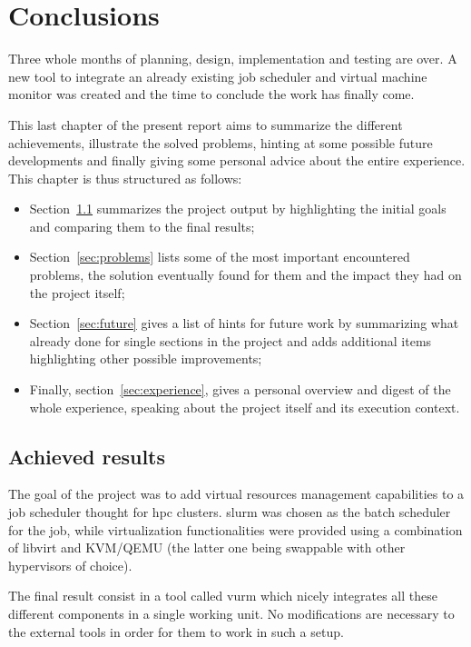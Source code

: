 \chapter{Conclusions}
\label{sec:conclusions}

Three whole months of planning, design, implementation and testing are over. A new tool to integrate an already existing job scheduler and virtual machine monitor was created and the time to conclude the work has finally come.

This last chapter of the present report aims to summarize the different achievements, illustrate the solved problems, hinting at some possible future developments and finally giving some personal advice about the entire experience. This chapter is thus structured as follows:

\begin{itemize}
	\item Section~\ref{sec:results} summarizes the project output by highlighting the initial goals and comparing them to the final results;
	\item Section~\ref{sec:problems} lists some of the most important encountered problems, the solution eventually found for them and the impact they had on the project itself;
	\item Section~\ref{sec:future} gives a list of hints for future work by summarizing what already done for single sections in the project and adds additional items highlighting other possible improvements;
	\item Finally, section~\ref{sec:experience}, gives a personal overview and digest of the whole experience, speaking about the project itself and its execution context.
\end{itemize}



\section{Achieved results}
\label{sec:results}

The goal of the project was to add virtual resources management capabilities to a job scheduler thought for \gls{hpc} clusters. \gls{slurm} was chosen as the batch scheduler for the job, while virtualization functionalities were provided using a combination of libvirt and KVM/QEMU (the latter one being swappable with other hypervisors of choice).

The final result consist in a tool called \gls{vurm} which nicely integrates all these different components in a single working unit. No modifications are necessary to the external tools in order for them to work in such a setup.

